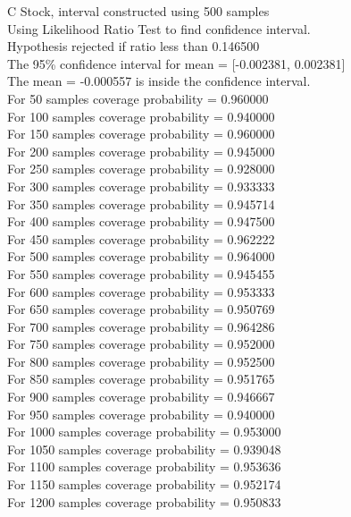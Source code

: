 \documentclass{article}
\begin{document}
C Stock, interval constructed using 500 samples\\
Using Likelihood Ratio Test to find confidence interval.\\
Hypothesis rejected if ratio less than 0.146500\\
The 95\% confidence interval for mean = [-0.002381, 0.002381]\\
The mean = -0.000557 is inside the confidence interval.\\
For 50 samples coverage probability = 0.960000\\
For 100 samples coverage probability = 0.940000\\
For 150 samples coverage probability = 0.960000\\
For 200 samples coverage probability = 0.945000\\
For 250 samples coverage probability = 0.928000\\
For 300 samples coverage probability = 0.933333\\
For 350 samples coverage probability = 0.945714\\
For 400 samples coverage probability = 0.947500\\
For 450 samples coverage probability = 0.962222\\
For 500 samples coverage probability = 0.964000\\
For 550 samples coverage probability = 0.945455\\
For 600 samples coverage probability = 0.953333\\
For 650 samples coverage probability = 0.950769\\
For 700 samples coverage probability = 0.964286\\
For 750 samples coverage probability = 0.952000\\
For 800 samples coverage probability = 0.952500\\
For 850 samples coverage probability = 0.951765\\
For 900 samples coverage probability = 0.946667\\
For 950 samples coverage probability = 0.940000\\
For 1000 samples coverage probability = 0.953000\\
For 1050 samples coverage probability = 0.939048\\
For 1100 samples coverage probability = 0.953636\\
For 1150 samples coverage probability = 0.952174\\
For 1200 samples coverage probability = 0.950833\\
\end{document}
